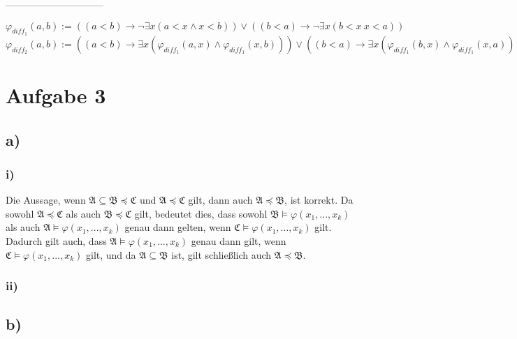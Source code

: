\documentclass[11pt, a4paper]{article}
\renewcommand{\v}{\vee}
\newcommand{\n}{\wedge}
\begin{document}
------------------------------

$\varphi_{diff_1}(a,b) := ((a < b) \rightarrow \neg \exists x (a < x \n x < b)) \v ((b < a) \rightarrow \neg \exists x (b < x \ x < a))$\\
$\varphi_{diff_2}(a,b) := ((a < b) \rightarrow \exists x (\varphi_{diff_1}(a,x) \n \varphi_{diff_1}(x, b))) \v ((b < a) \rightarrow \exists x (\varphi_{diff_1}(b,x) \n \varphi_{diff_1}(x,a)))$\\


\section*{Aufgabe 3}
\subsection*{a)}
\subsubsection*{i)}
Die Aussage, wenn $\mathfrak{A} \subseteq \mathfrak{B} \preceq \mathfrak{C}$ und $\mathfrak{A} \preceq \mathfrak{C}$ gilt, dann auch $\mathfrak{A} \preceq \mathfrak{B}$, ist korrekt. Da sowohl $\mathfrak{A} \preceq \mathfrak{C}$ als auch $\mathfrak{B} \preceq \mathfrak{C}$ gilt, bedeutet dies, dass sowohl $\mathfrak{B} \vDash \varphi(x_1,...,x_k)$ als auch $\mathfrak{A} \vDash \varphi(x_1,...,x_k)$ genau dann gelten, wenn $\mathfrak{C} \vDash \varphi(x_1,...,x_k)$ gilt. Dadurch gilt auch, dass $\mathfrak{A} \vDash \varphi(x_1,...,x_k)$ genau dann gilt, wenn $\mathfrak{C} \vDash \varphi(x_1,...,x_k)$ gilt, und da $\mathfrak{A} \subseteq \mathfrak{B}$ ist, gilt schließlich auch $\mathfrak{A} \preceq \mathfrak{B}$.

\subsubsection*{ii)}

\subsection*{b)}
\end{document}
